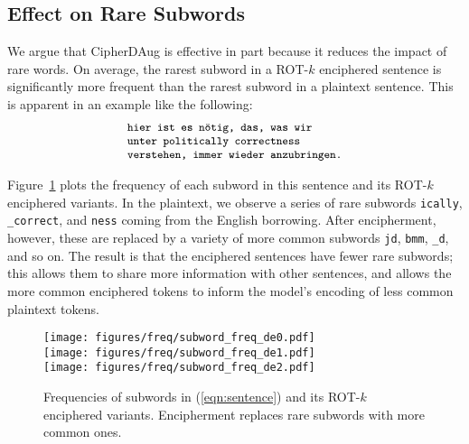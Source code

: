 \documentclass[11pt]{article}
\begin{document}
\subsection{Effect on Rare Subwords}
We argue that CipherDAug is effective in part because it reduces the impact of rare words. 
On average, the rarest subword in a ROT-$k$ enciphered sentence is significantly more frequent than the rarest subword in a plaintext sentence. 
This is apparent in an example like the following:\\[-2em]

\begin{equation}\label{eqn:sentence}
\makebox[0.8\columnwidth]{
        \small
        $\begin{array}{l}
        \texttt{hier ist es n\"otig, das, was wir}\\
        \texttt{unter politically correctness}\\
        \texttt{verstehen, immer wieder anzubringen.}\\
        \end{array}$
    }
\end{equation}

Figure~\ref{fig:subword_freq} plots the frequency of each subword in this sentence and its ROT-$k$ enciphered variants. In the plaintext, we observe a series of rare subwords \texttt{ically}, \texttt{\_correct}, and \texttt{ness} coming from the English borrowing. After encipherment, however, these are replaced by a variety of more common subwords \texttt{jd}, \texttt{bmm}, \texttt{\_d}, and so on. The result is that the enciphered sentences have fewer rare subwords; this allows them to share more information with other sentences, and allows the more common enciphered tokens to inform the model's encoding of less common plaintext tokens.

\begin{figure}[hbt]
    \centering
\texttt{[image: figures/freq/subword\_freq\_de0.pdf]}\\[0.3em]
    \texttt{[image: figures/freq/subword\_freq\_de1.pdf]}\\[0.3em]
    \texttt{[image: figures/freq/subword\_freq\_de2.pdf]}\\
\caption{
Frequencies of subwords in (\ref{eqn:sentence}) and its ROT-$k$ enciphered variants. Encipherment replaces rare subwords with more common ones.}
    \label{fig:subword_freq}
\end{figure}
\end{document}
